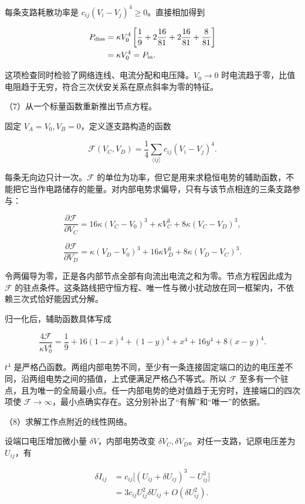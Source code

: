 \documentclass[12pt,a4paper,fontset=fandol]{ctexart}
\begin{document}
每条支路耗散功率是 \(c_{ij}(V_i-V_j)^4\ge0\)。直接相加得到

\[
\begin{aligned}
P_{\rm diss}
&=\kappa V_0^4\left[
\frac19+2\frac{16}{81}+2\frac{16}{81}+\frac8{81}\right]\\
&=\kappa V_0^4=P_{\rm in}.
\end{aligned}
\]

这项检查同时检验了网络连线、电流分配和电压降。\(V_0\to0\)
时电流趋于零，比值电阻趋于无穷，符合三次伏安关系在原点斜率为零的特征。

（7）从一个标量函数重新推出节点方程。

固定 \(V_A=V_0,V_B=0\)，定义逐支路构造的函数

\[
\mathcal F(V_C,V_D)=\frac14\sum_{\langle ij\rangle}
c_{ij}(V_i-V_j)^4.
\]

每条无向边只计一次。\(\mathcal F\)
的单位为功率，但它是用来求稳恒电势的辅助函数，不能把它当作电路储存的能量。对内部电势求偏导，只有与该节点相连的三条支路参与：

\[
\frac{\partial\mathcal F}{\partial V_C}
=16\kappa(V_C-V_0)^3+\kappa V_C^3
+8\kappa(V_C-V_D)^3,
\]

\[
\frac{\partial\mathcal F}{\partial V_D}
=\kappa(V_D-V_0)^3+16\kappa V_D^3
+8\kappa(V_D-V_C)^3.
\]

令两偏导为零，正是各内部节点全部有向流出电流之和为零。节点方程因此成为
\(\mathcal F\)
的驻点条件。这条路线把守恒方程、唯一性与微小扰动放在同一框架内，不依赖三次式恰好能因式分解。

归一化后，辅助函数具体写成

\[
\frac{4\mathcal F}{\kappa V_0^4}
=\frac19+16(1-x)^4+(1-y)^4
+x^4+16y^4+8(x-y)^4.
\]

\(t^4\)
是严格凸函数。两组内部电势不同，至少有一条连接固定端口的边的电压差不同，沿两组电势之间的插值，上式便满足严格凸不等式。所以
\(\mathcal F\)
至多有一个驻点，且为唯一的全局最小点。任一内部电势的绝对值趋于无穷时，连接端口的四次项使
\(\mathcal F\to\infty\)，最小点确实存在。这分别补出了``有解''和``唯一''的依据。

（8）求解工作点附近的线性网络。

设端口电压增加微小量 \(\delta V\)，内部电势改变
\(\delta V_C,\delta V_D\)。对任一支路，记原电压差为 \(U_{ij}\)，有

\[
\begin{aligned}
\delta I_{ij}
&=c_{ij}\big[(U_{ij}+\delta U_{ij})^3-U_{ij}^3\big]\\
&=3c_{ij}U_{ij}^2\delta U_{ij}+O(\delta U_{ij}^2).
\end{aligned}
\]
\end{document}
